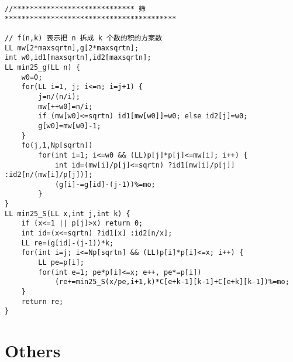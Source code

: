 \documentclass[6pt]{article}
\begin{document}
\begin{multicols}{2}
\begin{lstlisting}
//***************************** 筛 *****************************************

// f(n,k) 表示把 n 拆成 k 个数的积的方案数
LL mw[2*maxsqrtn],g[2*maxsqrtn];
int w0,id1[maxsqrtn],id2[maxsqrtn];
LL min25_g(LL n) {
    w0=0;
    for(LL i=1, j; i<=n; i=j+1) {
        j=n/(n/i);
        mw[++w0]=n/i;
        if (mw[w0]<=sqrtn) id1[mw[w0]]=w0; else id2[j]=w0;
        g[w0]=mw[w0]-1;
    }
    fo(j,1,Np[sqrtn])
        for(int i=1; i<=w0 && (LL)p[j]*p[j]<=mw[i]; i++) {
            int id=(mw[i]/p[j]<=sqrtn) ?id1[mw[i]/p[j]] :id2[n/(mw[i]/p[j])];
            (g[i]-=g[id]-(j-1))%=mo;
        }
}
LL min25_S(LL x,int j,int k) {
    if (x<=1 || p[j]>x) return 0;
    int id=(x<=sqrtn) ?id1[x] :id2[n/x];
    LL re=(g[id]-(j-1))*k;
    for(int i=j; i<=Np[sqrtn] && (LL)p[i]*p[i]<=x; i++) {
        LL pe=p[i];
        for(int e=1; pe*p[i]<=x; e++, pe*=p[i])
            (re+=min25_S(x/pe,i+1,k)*C[e+k-1][k-1]+C[e+k][k-1])%=mo;
    }
    return re;
}
\end{lstlisting}

  \section{Others}


\end{multicols}
\end{document}
